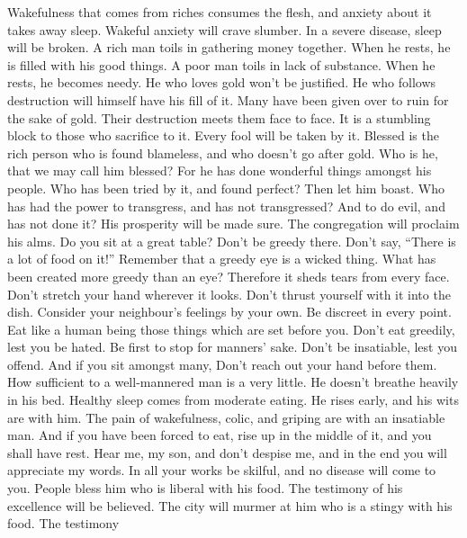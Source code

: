 Wakefulness that comes from riches consumes the flesh, and
anxiety about it takes away sleep.  Wakeful anxiety will
crave slumber. In a severe disease, sleep will be broken.  A
rich man toils in gathering money together. When he rests, he is filled
with his good things.  A poor man toils in lack of
substance. When he rests, he becomes needy.  He who loves
gold won't be justified. He who follows destruction will himself have
his fill of it.  Many have been given over to ruin for the
sake of gold. Their destruction meets them face to face.  It
is a stumbling block to those who sacrifice to it. Every fool will be
taken by it.  Blessed is the rich person who is found
blameless, and who doesn't go after gold.  Who is he, that
we may call him blessed? For he has done wonderful things amongst his
people.  Who has been tried by it, and found perfect? Then
let him boast. Who has had the power to transgress, and has not
transgressed? And to do evil, and has not done it?  His
prosperity will be made sure. The congregation will proclaim his alms.
 Do you sit at a great table? Don't be greedy there. Don't
say, ``There is a lot of food on it!''  Remember that a
greedy eye is a wicked thing. What has been created more greedy than an
eye? Therefore it sheds tears from every face.  Don't
stretch your hand wherever it looks. Don't thrust yourself with it into
the dish.  Consider your neighbour's feelings by your own.
Be discreet in every point.  Eat like a human being those
things which are set before you. Don't eat greedily, lest you be hated.
 Be first to stop for manners' sake. Don't be insatiable,
lest you offend.  And if you sit amongst many, Don't reach
out your hand before them.  How sufficient to a
well-mannered man is a very little. He doesn't breathe heavily in his
bed.  Healthy sleep comes from moderate eating. He rises
early, and his wits are with him. The pain of wakefulness, colic, and
griping are with an insatiable man.  And if you have been
forced to eat, rise up in the middle of it, and you shall have rest.
 Hear me, my son, and don't despise me, and in the end you
will appreciate my words. In all your works be skilful, and no disease
will come to you.  People bless him who is liberal with his
food. The testimony of his excellence will be believed. 
The city will murmer at him who is a stingy with his food. The testimony
